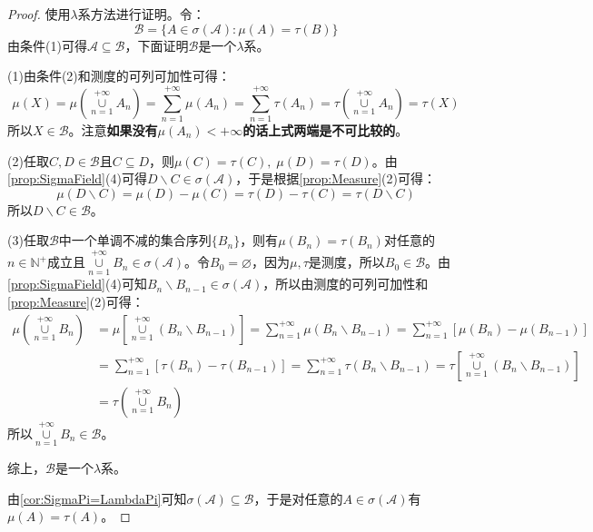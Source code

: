 \begin{proof}
	使用$\lambda$系方法进行证明。令：
	\begin{equation*}
		\mathscr{B}=\{A\in\sigma(\mathscr{A}):\mu(A)=\tau(B)\}
	\end{equation*}
	由条件(1)可得$\mathscr{A}\subseteq\mathscr{B}$，下面证明$\mathscr{B}$是一个$\lambda$系。\par
	(1)由条件(2)和测度的可列可加性可得：
	\begin{equation*}
		\mu(X)=\mu\left(\underset{n=1}{\overset{+\infty}{\cup}}A_n\right)=\sum_{n=1}^{+\infty}\mu(A_n)=\sum_{n=1}^{+\infty}\tau(A_n)=\tau\left(\underset{n=1}{\overset{+\infty}{\cup}}A_n\right)=\tau(X)
	\end{equation*}
	所以$X\in\mathscr{B}$。注意\textbf{如果没有$\mu(A_n)<+\infty$的话上式两端是不可比较的}。\par
	(2)任取$C,D\in\mathscr{B}$且$C\subseteq D$，则$\mu(C)=\tau(C),\;\mu(D)=\tau(D)$。由\cref{prop:SigmaField}(4)可得$D\backslash C\in\sigma(\mathscr{A})$，于是根据\cref{prop:Measure}(2)可得：
	\begin{equation*}
		\mu(D\backslash C)=\mu(D)-\mu(C)=\tau(D)-\tau(C)=\tau(D\backslash C)
	\end{equation*}
	所以$D\backslash C\in\mathscr{B}$。\par
	(3)任取$\mathscr{B}$中一个单调不减的集合序列$\{B_n\}$，则有$\mu(B_n)=\tau(B_n)$对任意的$n\in\mathbb{N}^+$成立且$\underset{n=1}{\overset{+\infty}{\cup}}B_n\in\sigma(\mathscr{A})$。令$B_0=\varnothing$，因为$\mu,\tau$是测度，所以$B_0\in\mathscr{B}$。由\cref{prop:SigmaField}(4)可知$B_n\backslash B_{n-1}\in\sigma(\mathscr{A})$，所以由测度的可列可加性和\cref{prop:Measure}(2)可得：
	\begin{align*}
		\mu\left(\underset{n=1}{\overset{+\infty}{\cup}}B_n\right)&=\mu\left[\underset{n=1}{\overset{+\infty}{\cup}}(B_n\backslash B_{n-1})\right]=\sum_{n=1}^{+\infty}\mu(B_n\backslash B_{n-1})=\sum_{n=1}^{+\infty}[\mu(B_n)-\mu(B_{n-1})] \\
		&=\sum_{n=1}^{+\infty}[\tau(B_n)-\tau(B_{n-1})]=\sum_{n=1}^{+\infty}\tau(B_n\backslash B_{n-1})=\tau\left[\underset{n=1}{\overset{+\infty}{\cup}}(B_n\backslash B_{n-1})\right] \\
		&=\tau\left(\underset{n=1}{\overset{+\infty}{\cup}}B_n\right)
	\end{align*}
	所以$\underset{n=1}{\overset{+\infty}{\cup}}B_n\in\mathscr{B}$。\par
	综上，$\mathscr{B}$是一个$\lambda$系。\par
	由\cref{cor:SigmaPi=LambdaPi}可知$\sigma(\mathscr{A})\subseteq \mathscr{B}$，于是对任意的$A\in\sigma(\mathscr{A})$有$\mu(A)=\tau(A)$。
\end{proof}
